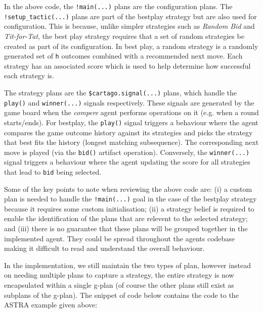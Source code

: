 In the above code, the \verb|!main(...)| plans are the configuration plans. The \verb|!setup_tactic(...)| 
plans are part of the bestplay strategy but are also used for configuration. This is because, unlike
simpler strategies such as \emph{Random Bid} and \emph{Tit-for-Tat}, the best play strategy requires 
that a set of random strategies be created as part of its configuration. In best play, a random strategy is
a randomly generated set of \verb|h| outcomes combined with a recommended next move. Each strategy has 
an associated score which is used to help determine how successful each strategy is.

The strategy plans are the \verb|$cartago.signal(...)| plans, which handle the \verb|play()| 
and \verb|winner(...)| signals respectively. These signals are generated by the game board when 
the  \emph{compere} agent performs operations on it (e.g. when a round starts/ends). For bestplay, the 
\verb|play()| signal triggers a behaviour where the agent compares the game outcome history against 
its strategies and picks the strategy that best fits the history (longest matching subsequence). The
corresponding next move is played (via the \verb|bid()| artifact operation). Conversely, the 
\verb|winner(...)| signal triggers a behaviour where the agent updating the score for all 
strategies that lead to \verb|bid| being selected.

Some of the key points to note when reviewing the above code are: (i) a custom plan is needed 
to handle the \verb|!main(...)| goal in the case of the bestplay strategy because it requires
some custom initialisation; (ii) a strategy belief is required to enable the identification of the
plans that are relevent to the selected strategy; and (iii) there is no guarantee that these
plans will be grouped together in the implemented agent. They could be spread throughout the
agents codebase making it difficult to read and understand the overall behaviour.

In the {\aser} implementation, we still maintain the two types of plan, however instead on needing
multiple plans to capture a strategy, the entire strategy is now encapsulated within a single
g-plan (of course the other plans still exist as subplans of the g-plan). The snippet of code 
below contains the {\aser} code to the ASTRA example given above:


